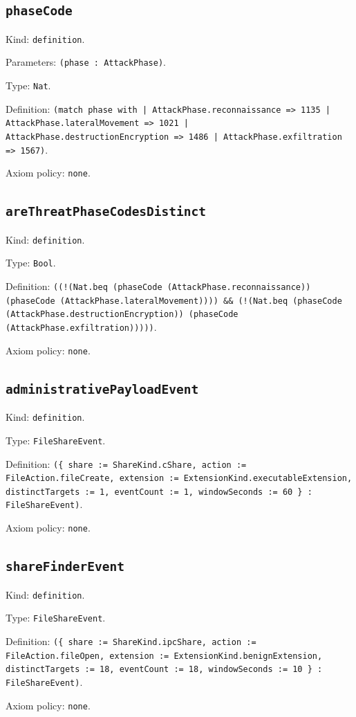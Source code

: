 \documentclass[11pt]{article}
\begin{document}
\subsection*{\texttt{phaseCode}}
\noindent Kind: \texttt{definition}.\par
\noindent Parameters: \texttt{(phase : AttackPhase)}.\par
\noindent Type: \texttt{Nat}.\par
\noindent Definition: \texttt{(match phase with | AttackPhase.reconnaissance => 1135 | AttackPhase.lateralMovement => 1021 | AttackPhase.destructionEncryption => 1486 | AttackPhase.exfiltration => 1567)}.\par
\noindent Axiom policy: \texttt{none}.\par
\subsection*{\texttt{areThreatPhaseCodesDistinct}}
\noindent Kind: \texttt{definition}.\par
\noindent Type: \texttt{Bool}.\par
\noindent Definition: \texttt{((!(Nat.beq (phaseCode (AttackPhase.reconnaissance)) (phaseCode (AttackPhase.lateralMovement)))) \&\& (!(Nat.beq (phaseCode (AttackPhase.destructionEncryption)) (phaseCode (AttackPhase.exfiltration)))))}.\par
\noindent Axiom policy: \texttt{none}.\par
\subsection*{\texttt{administrativePayloadEvent}}
\noindent Kind: \texttt{definition}.\par
\noindent Type: \texttt{FileShareEvent}.\par
\noindent Definition: \texttt{(\{ share := ShareKind.cShare, action := FileAction.fileCreate, extension := ExtensionKind.executableExtension, distinctTargets := 1, eventCount := 1, windowSeconds := 60 \} : FileShareEvent)}.\par
\noindent Axiom policy: \texttt{none}.\par
\subsection*{\texttt{shareFinderEvent}}
\noindent Kind: \texttt{definition}.\par
\noindent Type: \texttt{FileShareEvent}.\par
\noindent Definition: \texttt{(\{ share := ShareKind.ipcShare, action := FileAction.fileOpen, extension := ExtensionKind.benignExtension, distinctTargets := 18, eventCount := 18, windowSeconds := 10 \} : FileShareEvent)}.\par
\noindent Axiom policy: \texttt{none}.\par
\end{document}
